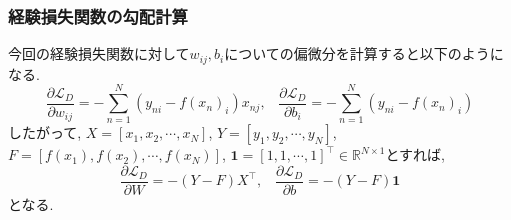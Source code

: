 \documentclass[dvipdfmx,11pt]{beamer}		%
\newcommand{\R}{\mathbb{R}}
\newcommand{\Loss}{\mathcal{L}_{D}}
\begin{document}
    \begin{frame}
        \frametitle{経験損失関数の勾配計算}
        今回の経験損失関数に対して$w_{ij}, b_{i}$についての偏微分を計算すると以下のようになる. 
        \begin{equation*}
            \frac{\partial\Loss}{\partial w_{ij}} = -\sum_{n = 1}^{N}\left(y_{ni} - f(x_{n})_{i}\right)x_{nj}, \hspace{10pt}\frac{\partial\Loss}{\partial b_{i}} = -\sum_{n = 1}^{N}(y_{ni} - f(x_{n})_{i})
        \end{equation*}
        したがって, $X = [x_{1}, x_{2}, \cdots, x_{N}]$, $Y = [y_1, y_2, \cdots, y_N]$, $F = [f(x_1), f(x_2), \cdots, f(x_N)]$, 
        $\mathbf{1} = [1, 1, \cdots, 1]^{\top}\in\R^{N\times 1}$とすれば,
        \begin{equation*}
            \frac{\partial\Loss}{\partial W} = -(Y - F)X^{\top}, \hspace{10pt}  \frac{\partial\Loss}{\partial b} = -(Y - F)\mathbf{1}
        \end{equation*}
        となる. 
    \end{frame}
\end{document}
